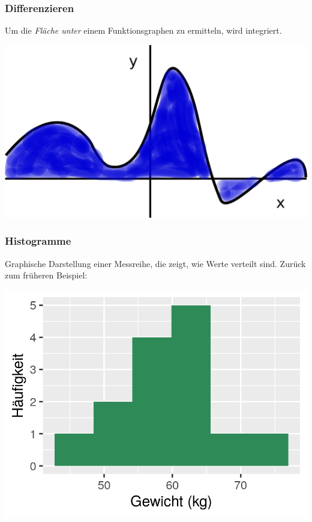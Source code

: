 \documentclass{beamer}
\begin{document}
\begin{frame}
\frametitle{Differenzieren}

Um die \emph{Fläche unter} einem Funktionsgraphen zu ermitteln, wird integriert.

\begin{center}
\includegraphics{function_int.png}
\end{center}


\end{frame}





\begin{frame}
\frametitle{Histogramme}

Graphische Darstellung einer Messreihe, die zeigt, wie Werte verteilt sind. Zurück zum früheren Beispiel:


\begin{center}
\includegraphics{histogram.png}
\end{center}


\end{frame}
\end{document}
